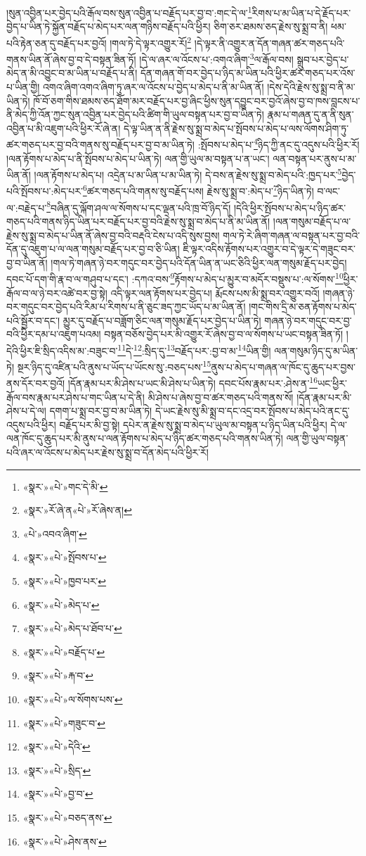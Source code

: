 །སུན་འབྱིན་པར་བྱེད་པའི་རྒོལ་བས་སུན་འབྱིན་པ་བརྗོད་པར་བྱ་བ་:གང་དེ་ལ་\footnote{«སྣར་»«པེ་»གང་དེ་མི་}རིགས་པ་མ་ཡིན་པ་དེ་རྗོད་པར་བྱེད་པ་ཡིན་ཏེ་སྐྱོན་བརྗོད་པ་མེད་པར་ལན་གཉིས་བརྗོད་པའི་ཕྱིར། ཅིག་ཅར་ཐམས་ཅད་རྗེས་སུ་སྨྲ་བ་ནི། ཕམ་པའི་རྟེན་ཅན་དུ་བརྗོད་པར་བྱའོ། །གལ་ཏེ་དེ་ལྟར་འགྱུར་རོ།\footnote{«སྣར་»རོ་ཞེ་ན«པེ་»རོ་ཞེས་ན།} །དེ་ལྟར་ནི་འགྱུར་ན་དོན་གཞན་ཚར་གཅད་པའི་གནས་ཡིན་ནོ་ཞེས་བྱ་བ་དེ་བསྟན་ཟིན་ཏོ། །དེ་ལ་ཞར་ལ་འོངས་པ་:འགའ་ཞིག་\footnote{«པེ་»འབའ་ཞིག་}ལ་རྒོལ་བས། སྒྲུབ་པར་བྱེད་པ་མེད་ན་མི་འབྱུང་བ་མ་ཡིན་པ་བརྗོད་པ་ནི། དོན་གཞན་གོ་བར་བྱེད་པ་ཉིད་མ་ཡིན་པའི་ཕྱིར་ཚར་གཅད་པར་འོས་པ་ཡིན་གྱི། འགའ་ཞིག་འགའ་ཞིག་ཏུ་ཞར་ལ་འོངས་པ་བྱེད་པ་མེད་པ་ནི་མ་ཡིན་ནོ། །དེས་དེའི་རྗེས་སུ་སྨྲ་བ་ནི་མ་ཡིན་ཏེ། ཁོ་བོ་ཅག་གིས་ཐམས་ཅད་ཐོག་མར་བརྗོད་པར་བྱ་ཞིང་ཕྱིས་སུན་དབྱུང་བར་བྱའོ་ཞེས་བྱ་བ་ཁས་བླངས་པ་ནི་མེད་ཀྱི་འོན་ཀྱང་སུན་འབྱིན་པར་བྱེད་པའི་ཚིག་གི་ཡུལ་བསྟན་པར་བྱ་བ་ཡིན་ཏེ། རྣམ་པ་གཞན་དུ་ན་ནི་སུན་འབྱིན་པ་མི་འཇུག་པའི་ཕྱིར་རོ་ཞེ་ན། དེ་ལྟ་ཡིན་ན་ནི་རྗེས་སུ་སྨྲ་བ་མེད་པ་སྤོབས་པ་མེད་པ་ལས་ལོགས་ཤིག་ཏུ་ཚར་གཅད་པར་བྱ་བའི་གནས་སུ་བརྗོད་པར་བྱ་བ་མ་ཡིན་ཏེ། :སྤོབས་པ་མེད་པ་\footnote{«སྣར་»«པེ་»སྤོབས་པ་}ཉིད་ཀྱི་ནང་དུ་འདུས་པའི་ཕྱིར་རོ། །ལན་རྟོགས་པ་མེད་པ་ནི་སྤོབས་པ་མེད་པ་ཡིན་ཏེ། ལན་གྱི་ཡུལ་མ་བསྟན་པ་ན་ཡང་། ལན་བསྟན་པར་ནུས་པ་མ་ཡིན་ནོ། །ལན་རྟོགས་པ་མེད་པ། འདྲེན་པ་མ་ཡིན་པ་མ་ཡིན་ཏེ། དེ་བས་ན་རྗེས་སུ་སྨྲ་བ་མེད་པའི་:ཁྱད་པར་\footnote{«སྣར་»«པེ་»ཁྱབ་པར་}བྱེད་པའི་སྤོབས་པ་:མེད་པར་\footnote{«སྣར་»«པེ་»མེད་པ་}ཚར་གཅད་པའི་གནས་སུ་བརྗོད་པས། རྗེས་སུ་སྨྲ་བ་:མེད་པ་\footnote{«སྣར་»«པེ་»མེད་པ་ཐོབ་པ་}ཉིད་ཡིན་ཏེ། བ་ལང་ལ་:བརྗེད་པ་\footnote{«སྣར་»«པེ་»བརྗོད་པ་}བཞིན་དུ་ལྐོག་ཤལ་ལ་སོགས་པ་དང་ལྡན་པའི་ཁྲ་བོ་ཉིད་དོ། །དེའི་ཕྱིར་སྤོབས་པ་མེད་པ་ཉིད་ཚར་གཅད་པའི་གནས་ཉིད་ཡིན་པར་བརྗོད་པར་བྱ་བའི་རྗེས་སུ་སྨྲ་བ་མེད་པ་ནི་མ་ཡིན་ནོ། །ལན་གསུམ་བརྗོད་པ་ལ་རྗེས་སུ་སྨྲ་བ་མེད་པ་ཡིན་ནོ་ཞེས་བྱ་བའི་བརྡའི་ངེས་པ་འདི་སུས་བྱས། གལ་ཏེ་རེ་ཞིག་གཞན་ལ་བསྟན་པར་བྱ་བའི་དོན་དུ་འཇུག་པ་ལ་ལན་གསུམ་བརྗོད་པར་བྱ་བ་ཅི་ཡིན། ཇི་ལྟར་འདིས་རྟོགས་པར་འགྱུར་བ་དེ་ལྟར་དེ་གཟུང་བར་བྱ་བ་ཡིན་ནོ། །གལ་ཏེ་གཞན་ཉེ་བར་གདུང་བར་བྱེད་པའི་དོན་ཡིན་ན་ཡང་ཅིའི་ཕྱིར་ལན་གསུམ་རྗོད་པར་བྱེད། དབང་པོ་དག་གི་རྣ་བ་ལ་གཤུབ་པ་དང་། :དཀའ་བས་\footnote{«སྣར་»«པེ་»རྐ་བ་}རྟོགས་པ་མེད་པ་མྱུར་བ་མདོར་བསྡུས་པ་:ལ་སོགས་\footnote{«སྣར་»«པེ་»ལ་སོགས་པས་}ཕྱིར་རྒོལ་བ་ལ་ཉེ་བར་འཚེ་བར་བྱ་སྟེ། འདི་ལྟར་ལན་རྟོགས་པར་བྱེད་པ། རྨོངས་པས་མི་སྨྲ་བར་འགྱུར་བའོ། །གཞན་ཉེ་བར་གདུང་བར་བྱེད་པའི་རིམ་པ་རིགས་པ་ནི་ཅུང་ཟད་ཀྱང་ཡོད་པ་མ་ཡིན་ནོ། །གང་གིས་དྲི་མ་ཅན་རྟོགས་པ་མེད་པའི་སྦྱོར་བ་དང་། མྱུར་དུ་བརྗོད་པ་བཟློག་ཅིང་ལན་གསུམ་རྗོད་པར་བྱེད་པ་ཡིན་ཏེ། གཞན་ཉེ་བར་གདུང་བར་བྱ་བའི་ཕྱིར་དམ་པ་འཇུག་པའམ། བསྟན་བཅོས་བྱེད་པར་མི་འགྱུར་རོ་ཞེས་བྱ་བ་ལ་སོགས་པ་ཡང་བསྟན་ཟིན་ཏོ། །དེའི་ཕྱིར་ཇི་སྲིད་འདིས་མ་:བཟུང་བ་\footnote{«སྣར་»«པེ་»གཟུང་བ་}དེ་\footnote{«སྣར་»«པེ་»དེའི་}:སྲིད་དུ་\footnote{«སྣར་»«པེ་»སྲིད་}བརྗོད་པར་:བྱ་བ་མ་\footnote{«སྣར་»«པེ་»བྱ་བ་}ཡིན་གྱི། ལན་གསུམ་ཉིད་དུ་མ་ཡིན་ཏེ། སྔར་ཉིད་དུ་འཛིན་པའི་ནུས་པ་ཡོད་པ་ཡོངས་སུ་:བཅད་པས་\footnote{«སྣར་»«པེ་»བཅད་ནས་}ནུས་པ་མེད་པ་གཞན་ལ་ཁོང་དུ་ཆུད་པར་བྱས་ནས་དོར་བར་བྱའོ། །དོན་རྣམ་པར་མི་ཤེས་པ་ཡང་མི་ཤེས་པ་ཡིན་ཏེ། དབང་པོས་རྣམ་པར་:ཤེས་ན་\footnote{«སྣར་»«པེ་»ཤེས་ནས་}ཡང་ཕྱིར་རྒོལ་བས་རྣམ་པར་ཤེས་པ་གང་ཡིན་པ་དེ་ནི། མི་ཤེས་པ་ཞེས་བྱ་བ་ཚར་གཅད་པའི་གནས་སོ། །དོན་རྣམ་པར་མི་ཤེས་པ་དེ་ལ། དགག་པ་སྨྲ་བར་བྱ་བ་མ་ཡིན་ཏེ། དེ་ཡང་རྗེས་སུ་མི་སྨྲ་བ་དང་འདྲ་བར་སྤོབས་པ་མེད་པའི་ནང་དུ་འདུས་པའི་ཕྱིར། བརྗོད་པར་མི་བྱ་སྟེ། དཔེར་ན་རྗེས་སུ་སྨྲ་བ་མེད་པ་ཡུལ་མ་བསྟན་པ་ཉིད་ཡིན་པའི་ཕྱིར། དེ་ལ་ལན་ཁོང་དུ་ཆུད་པར་མི་ནུས་པ་ལན་རྟོགས་པ་མེད་པ་ཉིད་ཚར་གཅད་པའི་གནས་ཡིན་ཏེ། ལན་གྱི་ཡུལ་བསྟན་པའི་ཞར་ལ་འོངས་པ་མེད་པར་རྗེས་སུ་སྨྲ་བ་དོན་མེད་པའི་ཕྱིར་རོ། 